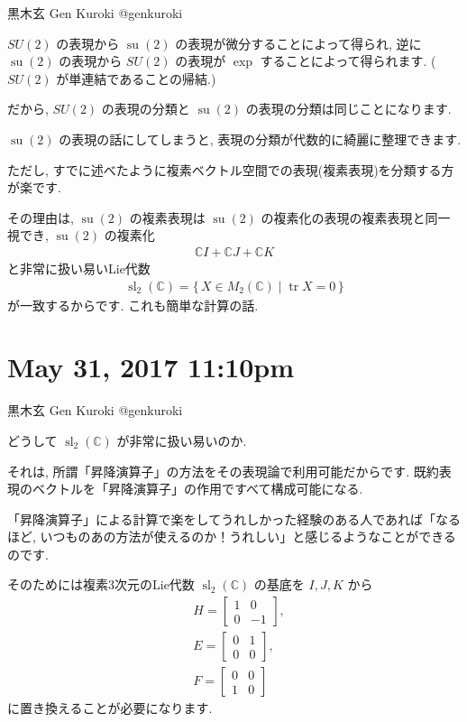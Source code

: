 \documentclass[12pt,twoside]{jarticle}
\newcommand\C{{\mathbb C}} %
\newcommand\su{\operatorname{su}}
\newcommand\sltwo{\operatorname{sl}_2(\C)}
\theoremstyle{jplain}
\theoremstyle{jplain}
\theoremstyle{jplain}
\numberwithin{theorem}{section}
\numberwithin{equation}{section}
\numberwithin{figure}{section}
\numberwithin{table}{section}
\begin{document}
黒木玄 Gen Kuroki
@genkuroki


$SU(2)$ の表現から $\su(2)$ の表現が微分することによって得られ, 逆に $\su(2)$ の表現から $SU(2)$ の表現が $\exp$ することによって得られます. ($SU(2)$ が単連結であることの帰結.)

だから, $SU(2)$ の表現の分類と $\su(2)$ の表現の分類は同じことになります. 

$\su(2)$ の表現の話にしてしまうと, 表現の分類が代数的に綺麗に整理できます. 

ただし, すでに述べたように複素ベクトル空間での表現(複素表現)を分類する方が楽です. 

その理由は, $\su(2)$ の複素表現は $\su(2)$ の複素化の表現の複素表現と同一視でき, $\su(2)$ の複素化\begin{align*}\mathbb C I+\mathbb C J+\mathbb C K\end{align*}と非常に扱い易いLie代数\begin{align*}\operatorname{sl}_2(\mathbb C)=\{\,X\in M_2(\mathbb C)\mid \operatorname{tr}X=0\,\}\end{align*}が一致するからです. これも簡単な計算の話. 







\section{ May 31, 2017 11:10pm}








黒木玄 Gen Kuroki
@genkuroki


どうして $\sltwo$ が非常に扱い易いのか. 

それは, 所謂「昇降演算子」の方法をその表現論で利用可能だからです. 既約表現のベクトルを「昇降演算子」の作用ですべて構成可能になる. 

「昇降演算子」による計算で楽をしてうれしかった経験のある人であれば「なるほど, いつものあの方法が使えるのか！うれしい」と感じるようなことができるのです. 

そのためには複素3次元のLie代数 $\sltwo$ の基底を $I,J,K$ から\begin{align*}
&H=\begin{bmatrix}1&0\\ 0&-1\end{bmatrix},\\&E=\begin{bmatrix}0&1\\ 0&0\end{bmatrix},\\&F=\begin{bmatrix}0&0\\ 1&0\end{bmatrix}\end{align*}に置き換えることが必要になります. 
\end{document}
